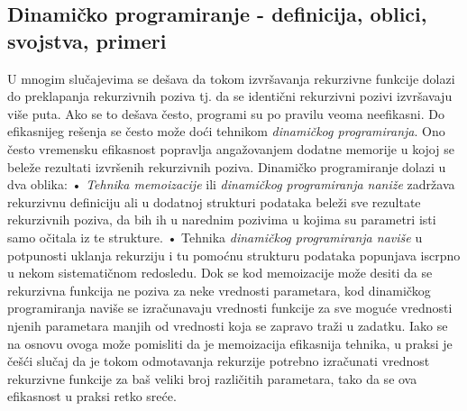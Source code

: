 \documentclass{article}
\begin{document}
\subsection{Dinamičko programiranje - definicija, oblici, svojstva, primeri}
U mnogim slučajevima se dešava da tokom izvršavanja rekurzivne funkcije dolazi
do preklapanja rekurzivnih poziva tj. da se identični rekurzivni pozivi izvršavaju
više puta. Ako se to dešava često, programi su po pravilu veoma neefikasni. Do efikasnijeg rešenja se često
može doći tehnikom \textit{dinamičkog programiranja}. Ono često vremensku efikasnost
popravlja angažovanjem dodatne memorije u kojoj se beleže rezultati izvršenih
rekurzivnih poziva. Dinamičko programiranje dolazi u dva oblika:
\newline
\hspace*{0.4cm}• \textit{Tehnika memoizacije} ili \textit{dinamičkog programiranja naniže} zadržava
rekurzivnu definiciju ali u dodatnoj strukturi podataka beleži sve rezultate rekurzivnih poziva, da bih ih u narednim
pozivima u kojima su parametri isti samo očitala iz te strukture.
\newline
\hspace*{0.4cm}• Tehnika \textit{dinamičkog programiranja naviše} u potpunosti uklanja rekurziju i
tu pomoćnu strukturu podataka popunjava iscrpno u nekom sistematičnom
redosledu.
\newline
Dok se kod memoizacije može desiti da se rekurzivna funkcija ne poziva za neke
vrednosti parametara, kod dinamičkog programiranja naviše se izračunavaju
vrednosti funkcije za sve moguće vrednosti njenih parametara manjih od vrednosti
koja se zapravo traži u zadatku. Iako se na osnovu ovoga može pomisliti da je
memoizacija efikasnija tehnika, u praksi je češći slučaj da je tokom odmotavanja
rekurzije potrebno izračunati vrednost rekurzivne funkcije za baš veliki broj
različitih parametara, tako da se ova efikasnost u praksi retko sreće.
\end{document}
